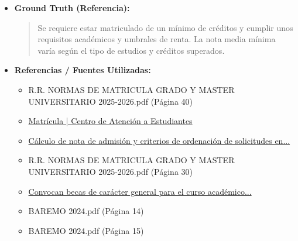 \documentclass[12pt,a4paper,oneside]{report}
\begin{document}
\begin{itemize}
\begin{itemize}
\begin{quote}
\textbf{Cálculo de la nota de admisión:}

La nota media de expediente académico del título de Grado, Máster u otro título universitario oficial se calcula conforme a lo regulado en el Acuerdo de 3 de febrero de 2016, de la Comisión del Distrito Único Universitario de Andalucía.

Puedes consultar más información sobre el cálculo de la nota de admisión y los criterios de ordenación en la página web de la Universidad de Sevilla: <https://cat.us.es/acceso-y-admision/admision-preinscripcion/grado/calculo-de-nota-de-admision-y-criterios-de>

Espero que esta información te sea útil. Si necesitas más detalles, no dudes en preguntar.
                \end{quote}
          \item \textbf{{Ground Truth (Referencia):}} \\
                \begin{quote}
Se requiere estar matriculado de un mínimo de créditos y cumplir unos requisitos académicos y umbrales de renta. La nota media mínima varía según el tipo de estudios y créditos superados.
                \end{quote}
          \item \textbf{{Referencias / Fuentes Utilizadas:}} \\
                \begin{itemize}
                  \item R.R. NORMAS DE MATRICULA GRADO Y MASTER UNIVERSITARIO 2025-2026.pdf (Página 40)
                  \item \href{https://cat.us.es/matricula}{Matrícula | Centro de Atención a Estudiantes}
                  \item \href{https://cat.us.es/acceso-y-admision/admision-preinscripcion/grado/calculo-de-nota-de-admision-y-criterios-de}{Cálculo de nota de admisión y criterios de ordenación de solicitudes en...}
                  \item R.R. NORMAS DE MATRICULA GRADO Y MASTER UNIVERSITARIO 2025-2026.pdf (Página 30)
                  \item \href{https://cat.us.es/sites/default/files/CAT/BECAS,+AYUDAS+Y+PREMIOS/resolucion-becas-ministerio-26-27.pdf}{Convocan becas de carácter general para el curso académico...}
                  \item BAREMO 2024.pdf (Página 14)
                  \item BAREMO 2024.pdf (Página 15)
                \end{itemize}
        \end{itemize}


\end{itemize}
\end{document}
